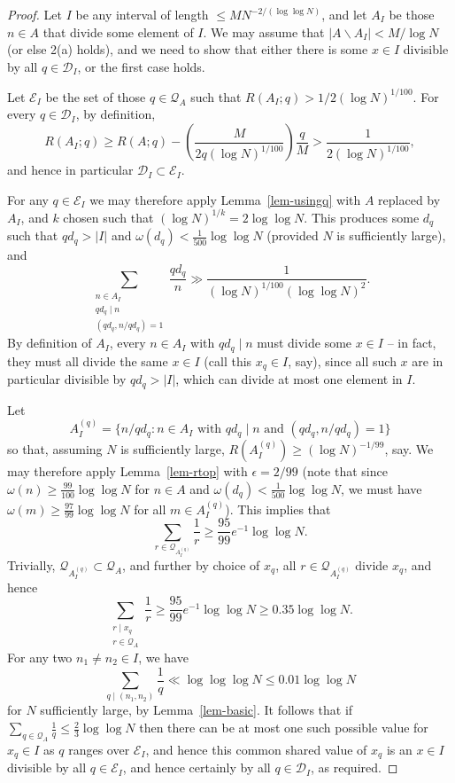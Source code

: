 \documentclass{amsart}
\newcommand{\abs}[1]{\left\lvert #1\right\rvert}
\newcommand{\brac}[1]{\left( #1\right)}
\begin{document}
\begin{proof}
Let $I$ be any interval of length $\leq MN^{-2/(\log\log N)}$, and let $A_I$ be those $n\in A$ that divide some element of $I$. We may assume that $\abs{A\backslash A_I}< M/\log N$ (or else 2(a) holds), and we need to show that either there is some $x\in I$ divisible by all $q\in\mathcal{D}_I$, or the first case holds. 

Let $\mathcal{E}_I$ be the set of those $q\in\mathcal{Q}_A$ such that $R(A_I;q)> 1/2(\log N)^{1/100}$. For every $q\in \mathcal{D}_I$, by definition, 
\[R(A_I; q) \geq R(A;q) - \brac{\frac{M}{2q(\log N)^{1/100}}}\frac{q}{M}>\frac{1}{2(\log N)^{1/100}},\]
and hence in particular $\mathcal{D}_I\subset \mathcal{E}_I$.

For any $q\in \mathcal{E}_I$ we may therefore apply Lemma~\ref{lem-usingq} with $A$ replaced by $A_I$, and $k$ chosen such that $(\log N)^{1/k}=2\log\log N$. This produces some $d_q$ such that $qd_q>\abs{I}$ and $\omega(d_q)<\tfrac{1}{500}\log\log N$ (provided $N$ is sufficiently large), and
\[\sum_{\substack{n\in A_I\\ qd_q\mid n\\ (qd_q,n/qd_q)=1}}\frac{qd_q}{n}\gg \frac{1}{(\log N)^{1/100}(\log\log N)^2}.\]
By definition of $A_I$, every $n\in A_I$ with $qd_q\mid n$ must divide some $x\in I$ -- in fact, they must all divide the same $x\in I$ (call this $x_q\in I$, say), since all such $x$ are in particular divisible by $qd_q>\abs{I}$, which can divide at most one element in $I$. 

Let 
\[A_I^{(q)}=\{ n/qd_q : n\in A_I\textrm{ with }qd_q\mid n\textrm{ and }(qd_q,n/qd_q)=1\}\]
so that, assuming $N$ is sufficiently large, $R(A_I^{(q)})\geq (\log N)^{-1/99}$, say. We may therefore apply Lemma~\ref{lem-rtop} with $\epsilon=2/99$ (note that since $\omega(n)\geq \frac{99}{100}\log\log N$ for $n\in A$ and $\omega(d_q)<\frac{1}{500}\log\log N$, we must have $\omega(m)\geq \frac{97}{99}\log\log N$ for all $m\in A_I^{(q)}$). This implies that 
\[\sum_{r\in \mathcal{Q}_{A_I^{(q)}}}\frac{1}{r}\geq \frac{95}{99}e^{-1}\log\log N.\]
Trivially, $\mathcal{Q}_{A_I^{(q)}}\subset \mathcal{Q}_A$, and further by choice of $x_q$, all $r\in \mathcal{Q}_{A_I^{(q)}}$ divide $x_q$, and hence 
\[\sum_{\substack{r\mid x_q\\ r\in \mathcal{Q}_A}}\frac{1}{r}\geq \frac{95}{99}e^{-1}\log\log N\geq 0.35\log\log N.\]
For any two $n_1\neq n_2\in I$, we have
\[\sum_{q\mid (n_1,n_2)}\frac{1}{q}\ll \log\log\log N\leq 0.01\log\log N\]
for $N$ sufficiently large, by Lemma~\ref{lem-basic}. It follows that if $\sum_{q\in\mathcal{Q}_A}\frac{1}{q}\leq \frac{2}{3}\log\log N$ then there can be at most one such possible value for $x_q\in I$ as $q$ ranges over $\mathcal{E}_I$, and hence this common shared value of $x_q$ is an $x\in I$ divisible by all $q\in\mathcal{E}_I$, and hence certainly by all $q\in\mathcal{D}_I$, as required.
 

\end{proof}
\end{document}
